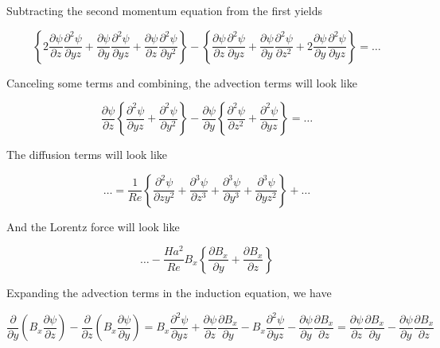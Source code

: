 \documentclass[11pt]{article}
\begin{document}
Subtracting the second momentum equation from the first yields

\begin{equation}
	\left\{
	2
	\frac{\partial \psi }{\partial z}
	\frac{\partial^2 \psi}{\partial yz}
	+
	\frac{\partial \psi}{\partial y}
	\frac{\partial^2 \psi}{\partial yz} +
	\frac{\partial \psi}{\partial z}
	\frac{\partial^2 \psi}{\partial y^2}
	\right\}
	-
	\left\{
	\frac{\partial \psi}{\partial z}
	\frac{\partial^2 \psi}{\partial yz} +
	\frac{\partial \psi}{\partial y}
	\frac{\partial^2 \psi}{\partial z^2}
	+
	2
	\frac{\partial \psi }{\partial y}
	\frac{\partial^2 \psi}{\partial yz}
	\right\}
	=
	\dots
\end{equation}

Canceling some terms and combining, the advection terms will look like


\begin{equation}
	\frac{\partial \psi }{\partial z}
	\left\{
	\frac{\partial^2 \psi}{\partial yz}
	+
	\frac{\partial^2 \psi}{\partial y^2}
	\right\}
	-
	\frac{\partial \psi}{\partial y}
	\left\{
	\frac{\partial^2 \psi}{\partial z^2}
	+
	\frac{\partial^2 \psi}{\partial yz}
	\right\}
	=
	\dots
\end{equation}


The diffusion terms will look like

\begin{equation}
	\dots
	=
	\frac{1}{Re}
	\left\{
	\frac{\partial^2 \psi}{\partial z y^2}
	+
	\frac{\partial^3 \psi}{\partial z^3}
	+
	\frac{\partial^3 \psi}{\partial y^3}
	+\frac{\partial^3 \psi}{\partial y z^2}
	\right\}
	+ \dots
\end{equation}

And the Lorentz force will look like

\begin{equation}
	\dots
	-
	\frac{Ha^2}{Re}
	B_x
	\left\{
	\frac{\partial B_x}{\partial y}
	+
	\frac{\partial B_x}{\partial z}
	\right\}
\end{equation}

Expanding the advection terms in the induction equation, we have

\begin{equation}
	\frac{\partial}{\partial y} \left( B_x \frac{\partial \psi}{\partial z} \right)
	- \frac{\partial}{\partial z} \left( B_x \frac{\partial \psi}{\partial y} \right)
	=
	B_x \frac{\partial^2 \psi}{\partial yz}
	+
	\frac{\partial \psi}{\partial z}
	\frac{\partial B_x}{\partial y}
	-
	B_x
	\frac{\partial^2 \psi}{\partial y z}
	-
	\frac{\partial \psi}{\partial y}
	\frac{\partial B_x}{\partial z}
	=
	\frac{\partial \psi}{\partial z}
	\frac{\partial B_x}{\partial y}
	-
	\frac{\partial \psi}{\partial y}
	\frac{\partial B_x}{\partial z}
\end{equation}
\end{document}
